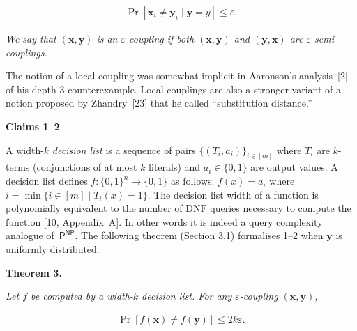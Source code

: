 \documentclass[10pt,a4paper]{article}
\begin{document}
\[\begin{gathered}
\Pr[\bm{x}_{i}\neq\bm{y}_{i}\mid\bm{y}=y]\leq\varepsilon.
\end{gathered}\]


\emph{We say that $(\bm{x},\bm{y})$ is an
$\varepsilon$-coupling if both $(\bm{x},\bm{y})$ and $(\bm{y},\bm{x})$ are $\varepsilon$-semi-couplings.}\par






The notion of a local coupling was somewhat implicit in Aaronson’s analysis [2] of his depth-3 counterexample. Local couplings are also a stronger variant of a notion proposed by Zhandry [23] that he called “substitution distance.”\par




\par\medskip\noindent\textbf{Claims 1–2
}\par




A width-$k$ \emph{decision list} is a sequence of pairs $\{(T_{i},a_{i})\}_{i\in[m]}$ where $T_{i}$ are $k$-terms (conjunctions of at most $k$ literals) and $a_{i}\in\{0,1\}$ are output values. A decision list defines $f\colon\{0,1\}^{n}\to\{0,1\}$ as follows: $f(x)=a_{i}$ where $i=\min\{i\in[m]\mid T_{i}(x)=1\}$. The decision list width of a function is polynomially equivalent to the number of $\mathrm{DNF}$ queries necessary to compute the function [10, Appendix A]. In other words it is indeed a query complexity analogue of $\textsf{P}^{\textsf{NP}}$. The following theorem (Section 3.1) formalises 1–2 when $\bm{y}$ is uniformly distributed.\par





\par\medskip\noindent\textbf{
\textbf{Theorem 3}\textbf{.}
}\par



\emph{Let $f$ be computed by a width-$k$ decision list. For any $\varepsilon$-coupling $(\bm{x},\bm{y})$,}\par


\[\begin{gathered}
\Pr[f(\bm{x})\neq f(\bm{y})]\leq 2k\varepsilon.
\end{gathered}\]
\end{document}
